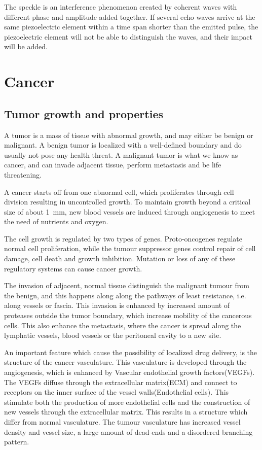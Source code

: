 The speckle is an interference phenomenon created by coherent waves with different phase and amplitude added together. If several echo waves arrive at the same piezoelectric element within a time span shorter than the emitted pulse, the piezoelectric element will not be able to distinguish the waves, and their impact will be added. 

\section{Cancer}
\subsection{Tumor growth and properties}

 A tumor is a mass of tissue with abnormal growth, and may either be benign or malignant. A benign tumor is localized with a  well-defined boundary and do usually not pose any health threat. A malignant tumor is what we know as cancer, and can invade adjacent tissue, perform metastasis and be life threatening. 

A cancer starts off from one abnormal cell, which proliferates through cell division resulting in uncontrolled growth. To maintain growth beyond a critical size of about \SI{1}{\milli\metre}\cite{king2006cancer}, new blood vessels are induced through angiogenesis to meet the need of nutrients and oxygen. 

The cell growth is regulated by two types of genes. Proto-oncogenes regulate normal cell proliferation, while the tumour suppressor genes control repair of cell damage, cell death and growth inhibition. Mutation or loss of any of these regulatory systems can cause cancer growth. 

The invasion of adjacent, normal tissue distinguish the malignant tumour from the benign, and this happens along along the pathways of least resistance, i.e. along vessels or fascia. This invasion is enhanced by increased amount of proteases outside the tumor boundary, which increase mobility of the cancerous cells. This also enhance the metastasis, where the cancer is spread along the lymphatic vessels, blood vessels or the peritoneal cavity to a new site.
 
An important feature which cause the possibility of localized drug delivery, is the structure of the cancer vasculature. This vasculature is developed through the angiogenesis, which is enhanced by Vascular endothelial growth factors(VEGFs). The VEGFs diffuse through the extracellular matrix(ECM) and connect to receptors on the inner surface of the vessel walls(Endothelial cells)\cite{Koumoutsakos2013}. This stimulate both the production of more endothelial cells and the construction of new vessels through the extracellular matrix\cite{Nishida2006}. This results in a structure which differ from normal vasculature. The tumour vasculature has increased vessel density and vessel size, a large amount of dead-ends and a disordered branching pattern.    

